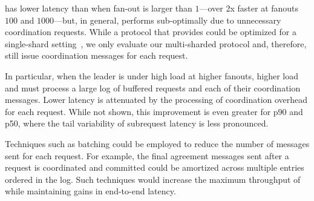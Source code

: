 \system has lower latency than \mpaxos when fan-out is larger than $1$---over 2x
faster at fanouts $100$ and $1000$---but, in general, performs sub-optimally due
to unnecessary coordination requests. While a protocol that provides \mdl could
be optimized for a single-shard setting~\cite{ongarothesis}, we only evaluate
our multi-sharded protocol and, therefore, still issue coordination messages for
each request.

In particular, when the leader is under high load at higher fanouts, higher load
and must process a large log of buffered requests and each of their coordination
messages. Lower latency is attenuated by the processing of coordination overhead
for each request. While not shown, this improvement is even greater for p90 and
p50, where the tail variability of subrequest latency is less pronounced.

Techniques such as batching could be employed to reduce the number of messages
sent for each request. For example, the final agreement messages sent after a
request is coordinated and committed could be amortized across multiple entries
ordered in the log. Such techniques would increase the maximum throughput of
\protocol while maintaining gains in end-to-end latency.

